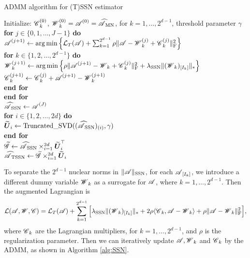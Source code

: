 \documentclass[12pt]{article}
\newcommand{\bm}{\boldsymbol}
\newcommand{\cm}[1]{\mbox{\boldmath$\mathscr{#1}$}}
\begin{document}
\begin{algorithm}[t]
	\caption{ADMM algorithm for (T)SSN estimator \label{alg:SSN}}
	Initialize: $\cm{C}_k^{(0)}$, $\cm{W}_k^{(0)}=\cm{A}^{(0)}=\cm{\widehat{A}}_{\text{MN}}$, for $k=1,\dots, 2^{d-1}$, threshold parameter $\gamma$\\
	\textbf{for} $j\in\{0,1,\dots, J-1\}$ \textbf{do}\\
	\hspace*{1cm} $\cm{A}^{(j+1)}\leftarrow\arg\min\Big\{\mathcal{L}_T(\cm{A})+\sum_{k=1}^{2^{d-1}}\rho\|\cm{A}-\cm{W}_k^{(j)}+\cm{C}_k^{(j)}\|_{\text{F}}^2\Big\}$\\
	\hspace*{1cm} \textbf{for} $k\in\{1,2,\dots, 2^{d-1}\}$ \textbf{do}\\
	\hspace*{2cm} $\cm{W}_k^{(j+1)}\leftarrow\arg\min\Big\{\rho\|\cm{A}^{(j+1)}-\cm{W}_k+\cm{C}_k^{(j)}\|_{\text{F}}^2+\lambda_{\text{SSN}}\|(\cm{W}_k)_{[I_k]}\|_*\Big\}$\\
	\hspace*{2cm} $\cm{C}^{(j+1)}_k\leftarrow\cm{C}_k^{(j)}+\cm{A}^{(j+1)}-\cm{W}^{(j+1)}_k$\\
	\hspace*{1cm} \textbf{end for}\\
	\textbf{end for}\\
	$\cm{\widehat{A}}_{\text{SSN}}\leftarrow \cm{A}^{(J)}$\\
	\textbf{for} $i\in\{1,2,\dots, 2d\}$ \textbf{do}\\
	\hspace*{1cm}  $\bm{\widetilde{U}}_i \leftarrow \text{Truncated\_SVD}((\cm{\widehat{A}}_{\text{SSN}})_{(i)}, \gamma)$\\
	\textbf{end for}\\
	$\cm{\widetilde{G}}\leftarrow\cm{\widehat{A}}_{\text{SSN}}\times_{i=1}^{2d}\bm{\widetilde{U}}_i^\top$\\ $\cm{\widehat{A}}_{\text{TSSN}}\leftarrow\cm{\widetilde{G}}\times_{i=1}^{2d}\bm{\widetilde{U}}_i$ 
\end{algorithm}

To separate the $2^{d-1}$ nuclear norms in $\|\cm{A}\|_{\text{SSN}}$, for each $\cm{A}_{[I_k]}$, we introduce a different dummy variable $\cm{W}_k$ as a surrogate for $\cm{A}$, where $k=1,\dots,2^{d-1}$. Then the augmented Lagrangian is
\begin{equation*}
\mathcal{L}(\cm{A},\cm{W},\cm{C})=\mathcal{L}_T(\cm{A})+\sum_{k=1}^{2^{d-1}}\Big[\lambda_{\text{SSN}}\|(\cm{W}_k)_{[I_k]}\|_*+2\rho\langle\cm{C}_k,\cm{A}-\cm{W}_k\rangle+\rho\|\cm{A}-\cm{W}_k\|_{\text{F}}^2\Big], 
\end{equation*}
where $\cm{C}_k$ are the Lagrangian multipliers, for $k=1,\dots,2^{d-1}$, and $\rho$ is the regularization parameter. Then we can iteratively update $\cm{A}, \cm{W}_k$ and $\cm{C}_k$ by the ADMM, as shown in Algorithm \ref{alg:SSN}. 
\end{document}
